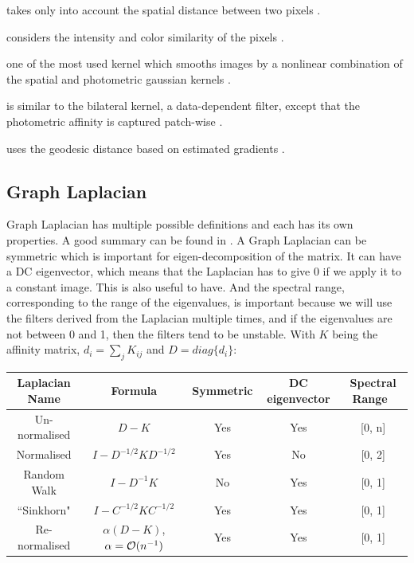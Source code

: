\begin{description}[align=left]
 \item [Spatial Gaussian Kernel] takes only into account the spatial distance between two pixels \cite{siam_slides_2016}.
 \item [Photometric Gaussian Kernel] considers the intensity and color similarity of the pixels \cite{siam_slides_2016}.
 \item [Bilateral Kernel] one of the most used kernel which smooths images by a nonlinear combination of the spatial and photometric gaussian kernels \cite{siam_slides_2016} \cite{glide_2014}.
 \item [Non-Local Means (NLM)] is similar to the bilateral kernel, a data-dependent filter, except that the photometric affinity is captured patch-wise \cite{glide_2014}.
 \item [Locally Adaptive Regression Kernel (LARK)] uses the geodesic distance based on estimated gradients \cite{milanfar_symmetrizing_2013} \cite{takeda_kernel_2007}.
\end{description}

\subsection{Graph Laplacian}
\label{subsec:laplacian-variations}
Graph Laplacian has multiple possible definitions and each has its own properties.
A good summary can be found in \cite{siam_slides_2016}.
A Graph Laplacian can be symmetric which is important for eigen-decomposition of the matrix.
It can have a DC eigenvector, which means that the Laplacian has to give 0 if we apply it to a constant image. This is also useful to have.
And the spectral range, corresponding to the range of the eigenvalues, is important because we will use the filters derived from the Laplacian multiple times, and if the eigenvalues are not between 0 and 1, then the filters tend to be unstable.
With \(K\) being the affinity matrix, \(d_i = \sum_j K_{ij}\) and \(D = diag\{d_i\}\): %

\begin{table}[!htbp]
 \centering
 \begin{tabular}{|c|c|c|c|c|}
  \hline
  Laplacian Name & Formula & Symmetric & DC eigenvector & Spectral Range \\
  \hline
  Un-normalised & \(D - K\) & Yes & Yes & [0, n] \\
  \hline
  Normalised & \(I - D^{-1/2}KD^{-1/2}\) & Yes & No & [0, 2] \\
  \hline
  Random Walk & \(I - D^{-1}K\) & No & Yes & [0, 1] \\
  \hline
  ``Sinkhorn" \cite{milanfar_symmetrizing_2013} & \(I - C^{-1/2}KC^{-1/2}\) & Yes & Yes & [0, 1] \\
  \hline
  Re-normalised & \(\alpha(D - K)\), \(\alpha = \operatorname{\mathcal{O}}(n^{-1})\) & Yes & Yes & [0, 1] \\
  \hline
 \end{tabular}
\end{table}

